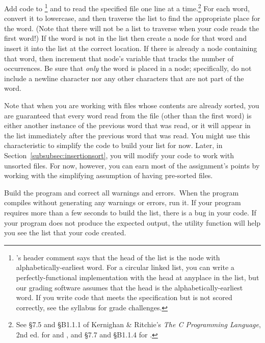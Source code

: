 Add code to \footnote{'s header comment says that the head of the list is the node with alphabetically-earliest word.
    For a circular linked list, you can write a perfectly-functional implementation with the head at anyplace in the list, but our grading software assumes that the head is the alphabetically-earliest word.
    If you write code that meets the specification but is not scored correctly, see the syllabus for grade challenges.}
and  to read the specified file one line at a time.\footnote{See \S7.5 and \S{}B1.1.1 of Kernighan \& Ritchie's \textit{The C Programming Language}, 2nd ed. for  and , and \S7.7 and \S{}B1.1.4 for .}
For each word, convert it to lowercase, and then traverse the list to find the appropriate place for the word.
(Note that there will not be a list to traverse when your code reads the first word!)
If the word is not in the list then create a node for that word and insert it into the list at the correct location.
If there is already a node containing that word, then increment that node's variable that tracks the number of occurrences.
Be sure that \textit{only} the word is placed in a node;
specifically, do not include a newline character nor any other characters that are not part of the word.

Note that when you are working with files whose contents are already sorted, you are guaranteed that every word read from the file (other than the first word) is either another instance of the previous word that was read, or it will appear in the list immediately after the previous word that was read.
You might use this characteristic to simplify the code to build your list for now.
Later, in Section~\ref{subsubsec:insertionsort}, you will modify your code to work with unsorted files.
For now, however, you can earn most of the assignment's points by working with the simplifying assumption of having pre-sorted files.

Build the program and correct all warnings and errors.\ When the program compiles without generating any warnings or errors, run it.
If your program requires more than a few seconds to build the list, there is a bug in your code.
If your program does not produce the expected output, the  utility function will help you see the list that your code created.

